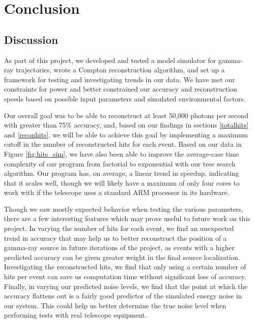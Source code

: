 \chapter{Conclusion}

\section{Discussion}
As part of this project, we developed and tested a model simulator for gamma-ray trajectories, wrote a Compton reconstruction algorithm, and set up a framework for testing and investigating trends in our data. We have met our constraints for power and better constrained our accuracy and reconstruction speeds based on possible input parameters and simulated environmental factors.

Our overall goal was to be able to reconstruct at least 50,000 photons per second with greater than 75\% accuracy, and, based on our findings in sections \ref{totalhits} and \ref{reconhits}, we will be able to achieve this goal by implementing a maximum cutoff in the number of reconstructed hits for each event. Based on our data in Figure \ref{fig:hits_sim}, we have also been able to improve the average-case time complexity of our program from factorial to exponential with our tree search algorithm. Our program has, on average, a linear trend in speedup, indicating that it scales well, though we will likely have a maximum of only four cores to work with if the telescope uses a standard ARM processor in its hardware.

Though we saw mostly expected behavior when testing the various parameters, there are a few interesting features which may prove useful to future work on this project. In varying the number of hits for each event, we find an unexpected trend in accuracy that may help us to better reconstruct the position of a gamma-ray source in future iterations of the project, as events with a higher predicted accuracy can be given greater weight in the final source localization. Investigating the reconstructed hits, we find that only using a certain number of hits per event can save us computation time without significant loss of accuracy. Finally, in varying our predicted noise levels, we find that the point at which the accuracy flattens out is a fairly good predictor of the simulated energy noise in our system. This could help us better determine the true noise level when performing tests with real telescope equipment.

